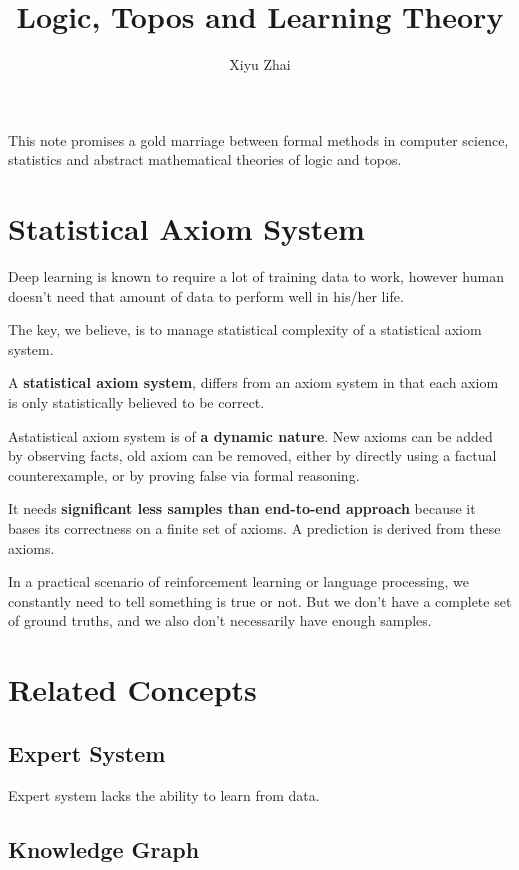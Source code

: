 \documentclass[11pt, oneside]{article}   	%
\title{Logic, Topos and Learning Theory}
\author{Xiyu Zhai}
\date{}							%
\theoremstyle{definition}
\begin{document}
\maketitle
\tableofcontents

This note promises a gold marriage between formal methods in computer science, statistics and abstract mathematical theories of logic and topos.

\section{Statistical Axiom System}

Deep learning is known to require a lot of training data to work, however human doesn't need that amount of data to perform well in his/her life.

The key, we believe, is to manage statistical complexity of a statistical axiom system.

A \textbf{statistical axiom system}, differs from an axiom system in that each axiom is only statistically believed to be correct.

Astatistical axiom system is of \textbf{a dynamic nature}. New axioms can be added by observing facts, old axiom can be removed, either by directly using a factual counterexample, or by proving false via formal reasoning.

It needs \textbf{significant less samples than end-to-end approach} because it bases its correctness on a finite set of axioms. A prediction is derived from these axioms.

In a practical scenario of reinforcement learning or language processing, we constantly need to tell something is true or not. But we don't have a complete set of ground truths, and we also don't necessarily have enough samples.

\section{Related Concepts}

\subsection{Expert System}
Expert system lacks the ability to learn from data.

\subsection{Knowledge Graph}
\end{document}
